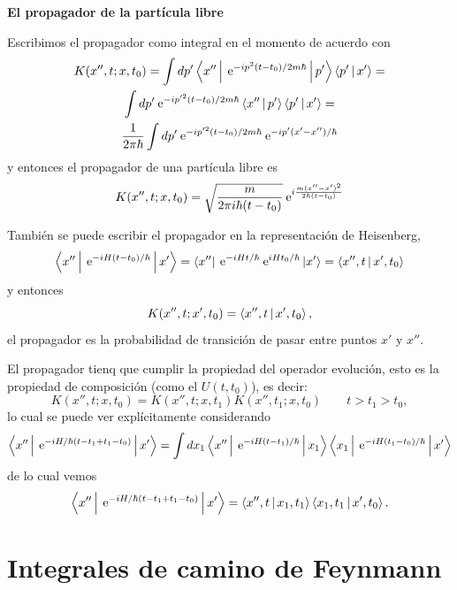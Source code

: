 \documentclass[10pt,oneside]{CBFT_book}
\begin{document}
\begin{ejemplo}{\bf El propagador de la partícula libre}

Escribimos el propagador como integral en el momento de acuerdo con
\begin{multline*}
 	K(x'',t; x, t_0) = \int dp' \Braket{x''|\:\mathrm{e}^{-ip^2(t-t_0)/2m\hbar}|p'} \Braket{p'|x'} = \\
 	\int dp' \:\mathrm{e}^{-ip'^{2}(t-t_0)/2m\hbar} \Braket{x''|p'} \Braket{p'|x'} = \\
 	\frac{1}{2\pi\hbar} \int dp' \:\mathrm{e}^{-ip'^{2}(t-t_0)/2m\hbar} \:\mathrm{e}^{-ip'(x'-x'')/\hbar}
\end{multline*}
y entonces el propagador de una partícula libre es
\[
	K(x'',t; x, t_0) = \sqrt{ \frac{m}{2\pi i\hbar(t-t_0)} } \:\mathrm{e}^{i\frac{m(x''-x')^2}{2\hbar(t-t_0)}}
\]

También se puede escribir el propagador en la representación de Heisenberg,
\[
	\Braket{x''|\:\mathrm{e}^{-iH(t-t_0)/\hbar}|x'} = 
	\Bra{x''}\:\mathrm{e}^{-iHt/\hbar} \:\mathrm{e}^{iHt_0/\hbar}\Ket{x'} = \Braket{x'',t|x',t_0}
\]
y entonces
\[
	K(x'',t;x',t_0) = \Braket{x'',t | x',t_0},
\]
el propagador es la probabilidad de transición de pasar entre puntos $x'$ y $x''$.

El propagador tienq que cumplir la propiedad del operador evolución, esto es la propiedad de composición 
(como el $U(t,t_0)$), es decir:
\[
	K(x'',t; x, t_0) = K(x'',t; x, t_1)K(x'',t_1; x, t_0) \qquad t>t_1>t_0,
\] 
lo cual se puede ver explícitamente considerando
\[
	\Braket{x''| \:\mathrm{e}^{-i H/\hbar ( t - t_1 + t_1 -t_0 )}|x'} =
	\int dx_1 \Braket{ x''| \:\mathrm{e}^{- i H (t-t_1) /\hbar } | x_1 }  
		\Braket{ x_1| \:\mathrm{e}^{- i H (t_1-t_0) /\hbar } | x' }
\]
de lo cual vemos
\[
	\Braket{x''| \:\mathrm{e}^{-i H/\hbar ( t - t_1 + t_1 -t_0 )}|x'} =
	\Braket{x'',t|x_1,t_1}  \Braket{x_1,t_1|x',t_0}.
\]

\end{ejemplo}


\section{Integrales de camino de Feynmann}
\end{document}
